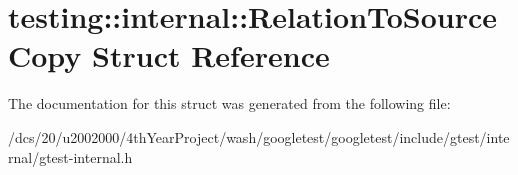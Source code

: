 \hypertarget{structtesting_1_1internal_1_1RelationToSourceCopy}{}\section{testing\+:\+:internal\+:\+:Relation\+To\+Source\+Copy Struct Reference}
\label{structtesting_1_1internal_1_1RelationToSourceCopy}


The documentation for this struct was generated from the following file\+:\begin{DoxyCompactItemize}
\item 
/dcs/20/u2002000/4th\+Year\+Project/wash/googletest/googletest/include/gtest/internal/gtest-\/internal.\+h\end{DoxyCompactItemize}
